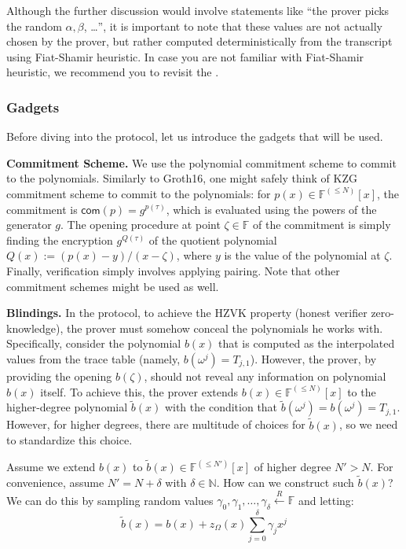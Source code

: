 \documentclass[../lecture-notes-148x210.tex]{subfiles}
\begin{document}
\begin{remark}
    Although the further discussion would involve statements like ``the prover
    picks the random $\alpha,\beta$, \ldots'', it is important to note that
    these values are not actually chosen by the prover, but rather computed
    deterministically from the transcript using Fiat-Shamir heuristic. In case 
    you are not familiar with Fiat-Shamir heuristic, we recommend you to revisit
    the .
\end{remark}

\subsubsection{Gadgets}

Before diving into the protocol, let us introduce the gadgets that will be used.

\textcolor{blue!60!black}{\textbf{Commitment Scheme.}} We use the polynomial
commitment scheme to commit to the polynomials. Similarly to Groth16, one might
safely think of KZG commitment scheme to commit to the polynomials: for $p(x)
\in \mathbb{F}^{(\leq N)}[x]$, the commitment is $\mathsf{com}(p) =
g^{p(\tau)}$, which is evaluated using the powers of the generator $g$. The
opening procedure at point $\zeta \in \mathbb{F}$ of the commitment is simply
finding the encryption $g^{Q(\tau)}$ of the quotient polynomial $Q(x) :=
(p(x)-y)/(x-\zeta)$, where $y$ is the value of the polynomial at $\zeta$.
Finally, verification simply involves applying pairing. Note that other
commitment schemes might be used as well.

\textcolor{blue!60!black}{\textbf{Blindings.}} In the protocol, to achieve 
the HZVK property (honest verifier zero-knowledge), the prover must somehow 
conceal the polynomials he works with. Specifically, consider the polynomial 
$b(x)$ that is computed as the interpolated values from the trace table (namely, 
$b(\omega^j) = T_{j,1}$). However, the prover, by providing the opening $b(\zeta)$,
should not reveal any information on polynomial $b(x)$ itself. To achieve this, the prover
extends $b(x) \in \mathbb{F}^{(\leq N)}[x]$ to the higher-degree polynomial $\widetilde{b}(x)$
with the condition that $\widetilde{b}(\omega^j) = b(\omega^j) = T_{j,1}$. However, for higher 
degrees, there are multitude of choices for $\widetilde{b}(x)$, so we need to standardize 
this choice. 

Assume we extend $b(x)$ to $\widetilde{b}(x) \in \mathbb{F}^{(\leq N')}[x]$ of
higher degree $N'>N$. For convenience, assume $N' = N + \delta$ with $\delta \in
\mathbb{N}$. How can we construct such $\widetilde{b}(x)$? We can do this by
sampling random values $\gamma_0,\gamma_1,\dots,\gamma_{\delta} \xleftarrow{R} \mathbb{F}$ and 
letting:
\begin{equation*}
    \widetilde{b}(x) = b(x) + z_{\Omega}(x)\sum_{j=0}^{\delta}\gamma_jx^j
\end{equation*}
\end{document}
